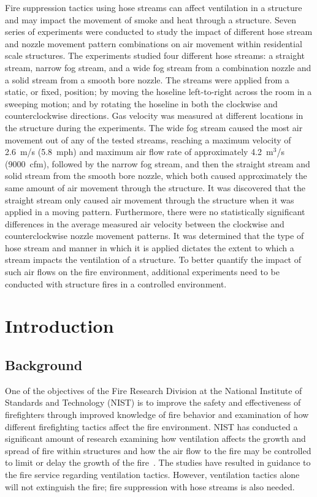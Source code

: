\documentclass[12pt,oneside]{book}
\begin{document}
Fire suppression tactics using hose streams can affect ventilation in a structure and may impact the movement of smoke and heat through a structure. Seven series of experiments were conducted to study the impact of different hose stream and nozzle movement pattern combinations on air movement within residential scale structures. The experiments studied four different hose streams: a straight stream, narrow fog stream, and a wide fog stream from a combination nozzle and a solid stream from a smooth bore nozzle. The streams were applied from a static, or fixed, position; by moving the hoseline left-to-right across the room in a sweeping motion; and by rotating the hoseline in both the clockwise and counterclockwise directions. Gas velocity was measured at different locations in the structure during the experiments. The wide fog stream caused the most air movement out of any of the tested streams, reaching a maximum velocity of 2.6~m/s (5.8~mph) and maximum air flow rate of approximately 4.2~m$^3$/s (9000~cfm), followed by the narrow fog stream, and then the straight stream and solid stream from the smooth bore nozzle, which both caused approximately the same amount of air movement through the structure. It was discovered that the straight stream only caused air movement through the structure when it was applied in a moving pattern. Furthermore, there were no statistically significant differences in the average measured air velocity between the clockwise and counterclockwise nozzle movement patterns. It was determined that the type of hose stream and manner in which it is applied dictates the extent to which a stream impacts the ventilation of a structure. To better quantify the impact of such air flows on the fire environment, additional experiments need to be conducted with structure fires in a controlled environment.

\mainmatter

\chapter{Introduction}
\label{chap:intro}
\section{Background}
\label{sec:background}

One of the objectives of the Fire Research Division at the National Institute of Standards and Technology (NIST) is to improve the safety and effectiveness of firefighters through improved knowledge of fire behavior and examination of how different firefighting tactics affect the fire environment. NIST has conducted a significant amount of research examining how ventilation affects the growth and spread of fire within structures and how the air flow to the fire may be controlled to limit or delay the growth of the fire~\cite{madrzykowski2009fire,kerber2009fire}. The studies have resulted in guidance to the fire service regarding ventilation tactics. However, ventilation tactics alone will not extinguish the fire; fire suppression with hose streams is also needed.
\end{document}
